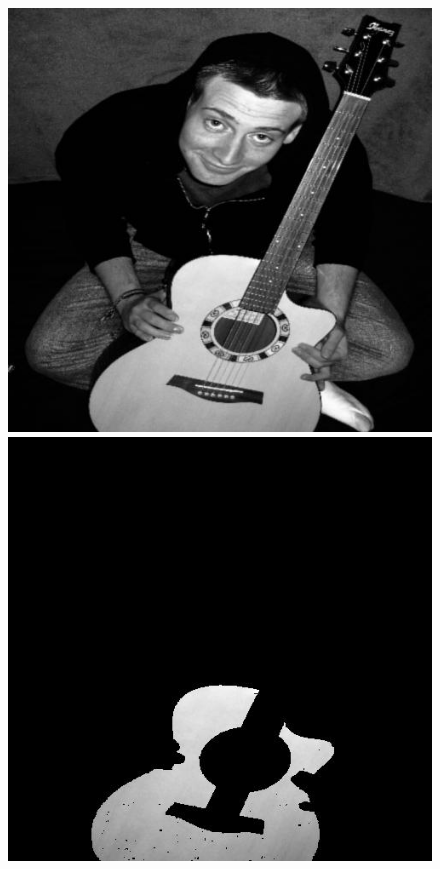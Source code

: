 \vfill
\begin{figure}[ht]
\begin{minipage}[b]{0.47\linewidth}
\centering
\includegraphics[width=\textwidth]{MSTseg1.jpg}
\end{minipage}
\hspace{0.5cm}
\begin{minipage}[b]{0.47\linewidth}
\centering
\includegraphics[width=\textwidth]{MSTseg2.jpg}

\end{minipage}
\end{figure}
